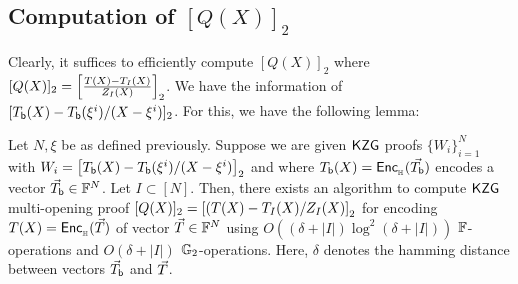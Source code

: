 \subsection{Computation of $[Q(X)]_2$}
Clearly, it suffices to efficiently compute $[Q(X)]_2$ where $[Q(X)]_2=\left[{\frac{T(X)-T_I(X)}{Z_I(X)}}\right]_2$. We have the information of $[T_{\mathsf{b}}({X})-T_{\mathsf{b}}({\xi^i})/(X-\xi^i)]_2$. For this, we have the following lemma:


\begin{lemma}\label{lem:approx-setup}
Let $N,\xi$ be as defined previously. Suppose we are given
$\mathsf{KZG}$ proofs $\{W_i\}_{i=1}^N$ with $W_i=\left[{T_{\mathsf{b}}({X}) - T_{\mathsf{b}}({\xi^i})/(X-\xi^i)}\right]_2$ and where
$T_{\mathsf{b}}({X})=\mathsf{Enc}_{{}_{\mathbb{H}}}(\vec{T_{\mathsf{b}}})$ encodes a vector $\vec{T}_{\mathsf{b}}\in \mathbb{F}^N$.
Let $I \subset [N]$.
Then,
there exists an algorithm to compute $\mathsf{KZG}$ multi-opening proof
$[Q(X)]_2=\left[{(T(X) - T_I(X)/Z_I(X)}\right]_2$ for encoding $T(X)=\mathsf{Enc}_{{}_{\mathbb{H}}}(\vec{T})$ of vector $\vec{T}\in \mathbb{F}^N$ using $O((\delta + |I|) \log^2 (\delta + |I|))$ $\mathbb{F}$-operations and $O(\delta + |I|)$ $\mathbb{G}_2$-operations.
Here, $\delta$ denotes the hamming distance
between vectors $\vec{T}_{\mathsf{b}}$ and $\vec{T}$.
\end{lemma}

